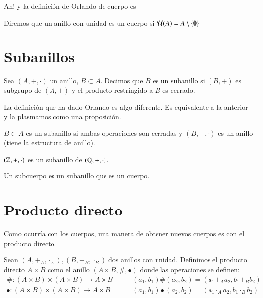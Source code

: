 Ah! y la definición de Orlando de cuerpo es

\begin{dfn}[Cuerpo]
	\label{dfn:cuerporlando}
	Diremos que un anillo con unidad es un cuerpo si $\mathcal{U}(A) = A \setminus \{\mathbf{0}\}$
\end{dfn}

\section{Subanillos}

\begin{dfn}[Subanillo]
	\cite{dor96} Sea $(A, +, \cdot)$ un anillo, $B\subset A$. Decimos que $B$ es un subanillo si $(B, +)$ es subgrupo de  $(A, +)$ y el producto restringido a $B$ es cerrado.
\end{dfn}

La definición que ha dado Orlando es algo diferente. Es equivalente a la anterior y la plasmamos como una proposición.

\begin{pro}
	$B \subset A$ es un subanillo si ambas operaciones son cerradas y $(B, +, \cdot)$ es un anillo (tiene la estructura de anillo).
\end{pro}

\begin{ej}
	$(\mathbb{Z}, +, \cdot)$ es un subanillo de $(\mathbb{Q}, +, \cdot)$.
\end{ej}

\begin{dfn}[Subcuerpo]
	Un subcuerpo es un subanillo que es un cuerpo.
\end{dfn}

\section{Producto directo}

Como ocurría con los cuerpos, una manera de obtener nuevos cuerpos es con el producto directo.

\begin{dfn}
	Sean $(A, +_A, \cdot_A), (B, +_B, \cdot_B)$ dos anillos con unidad. Definimos el producto directo $A \times B$ como el anillo $(A \times B, \#, \bullet)$ donde las operaciones se definen:
	\begin{align*}
	\# : (A\times B) \times (A\times B) \to A \times B\qquad &(a_1, b_1) \# (a_2, b_2) = (a_1 +_A a_2, b_1 +_B b_2) \\
	\bullet : (A\times B) \times (A\times B) \to A \times B\qquad &(a_1, b_1) \bullet (a_2, b_2) = (a_1 \cdot_A a_2, b_1 \cdot_B b_2)
	\end{align*}
\end{dfn}

